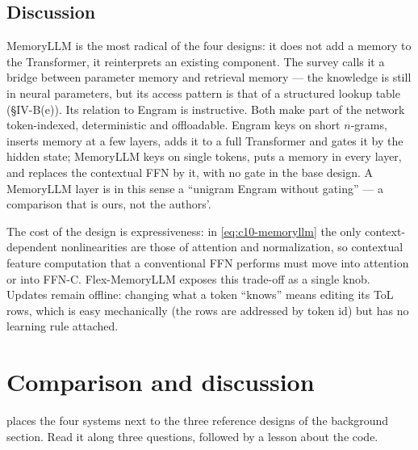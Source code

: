 \subsection{Discussion}

MemoryLLM is the most radical of the four designs: it does not add a memory to the Transformer,
it reinterprets an existing component. The survey calls it a bridge between parameter memory and
retrieval memory --- the knowledge is still in neural parameters, but its access pattern is that of
a structured lookup table (\S IV-B(e)). Its relation to Engram is instructive. Both make part of
the network token-indexed, deterministic and offloadable. Engram keys on short $n$-grams, inserts
memory at a few layers, adds it to a full Transformer and gates it by the hidden state; MemoryLLM
keys on single tokens, puts a memory in every layer, and replaces the contextual FFN by it, with
no gate in the base design. A MemoryLLM layer is in this sense a ``unigram Engram without gating''
--- a comparison that is ours, not the authors'.

The cost of the design is expressiveness: in \cref{eq:c10-memoryllm} the only context-dependent
nonlinearities are those of attention and normalization, so contextual feature computation that a
conventional FFN performs must move into attention or into FFN-C. Flex-MemoryLLM exposes this
trade-off as a single knob. Updates remain offline: changing what a token ``knows'' means editing
its ToL rows, which is easy mechanically (the rows are addressed by token id) but has no learning
rule attached.

\section{Comparison and discussion}\label{sec:c10-comparison}

 places the four systems next to the three reference designs of the
background section. Read it along three questions, followed by a lesson about the code.

